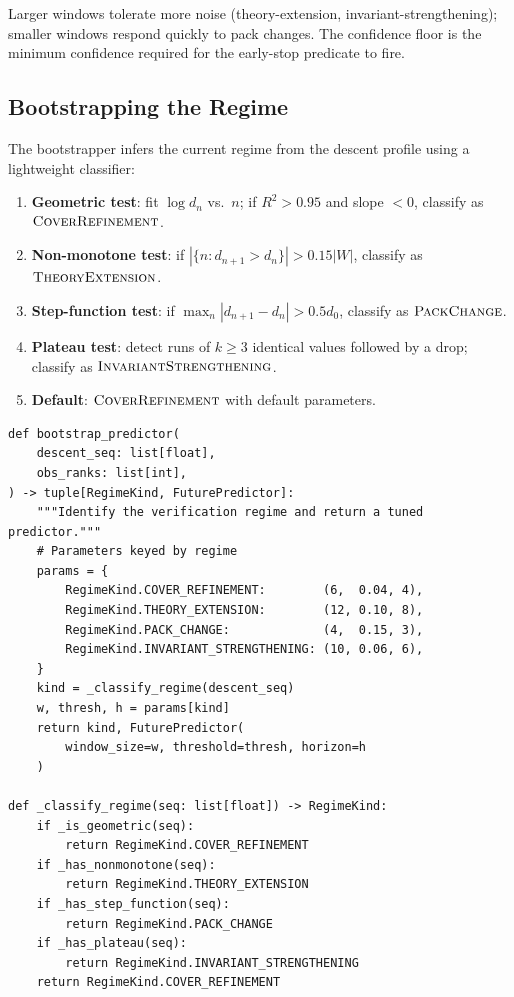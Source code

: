 \documentclass[11pt]{article}
\newcommand{\RKcov}{\textsc{CoverRefinement}}
\newcommand{\RKtheo}{\textsc{TheoryExtension}}
\newcommand{\RKpack}{\textsc{PackChange}}
\newcommand{\RKinv}{\textsc{InvariantStrengthening}}
\begin{document}
\noindent
Larger windows tolerate more noise (theory-extension, invariant-strengthening);
smaller windows respond quickly to pack changes.  The confidence floor
is the minimum confidence required for the early-stop predicate to fire.

\subsection{Bootstrapping the Regime}

The bootstrapper infers the current regime from the descent profile
using a lightweight classifier:

\begin{enumerate}
  \item \textbf{Geometric test}: fit $\log d_n$ vs.\ $n$; if $R^2 > 0.95$
        and slope $< 0$, classify as $\RKcov$.
  \item \textbf{Non-monotone test}: if $|\{n : d_{n+1} > d_n\}| > 0.15 |W|$,
        classify as $\RKtheo$.
  \item \textbf{Step-function test}: if $\max_n |d_{n+1} - d_n| > 0.5 d_0$,
        classify as $\RKpack$.
  \item \textbf{Plateau test}: detect runs of $k \ge 3$ identical values
        followed by a drop; classify as $\RKinv$.
  \item \textbf{Default}: $\RKcov$ with default parameters.
\end{enumerate}

\begin{lstlisting}[style=jugeo-python, caption={Regime bootstrapping: classify and configure predictor.}]
def bootstrap_predictor(
    descent_seq: list[float],
    obs_ranks: list[int],
) -> tuple[RegimeKind, FuturePredictor]:
    """Identify the verification regime and return a tuned predictor."""
    # Parameters keyed by regime
    params = {
        RegimeKind.COVER_REFINEMENT:        (6,  0.04, 4),
        RegimeKind.THEORY_EXTENSION:        (12, 0.10, 8),
        RegimeKind.PACK_CHANGE:             (4,  0.15, 3),
        RegimeKind.INVARIANT_STRENGTHENING: (10, 0.06, 6),
    }
    kind = _classify_regime(descent_seq)
    w, thresh, h = params[kind]
    return kind, FuturePredictor(
        window_size=w, threshold=thresh, horizon=h
    )

def _classify_regime(seq: list[float]) -> RegimeKind:
    if _is_geometric(seq):
        return RegimeKind.COVER_REFINEMENT
    if _has_nonmonotone(seq):
        return RegimeKind.THEORY_EXTENSION
    if _has_step_function(seq):
        return RegimeKind.PACK_CHANGE
    if _has_plateau(seq):
        return RegimeKind.INVARIANT_STRENGTHENING
    return RegimeKind.COVER_REFINEMENT
\end{lstlisting}
\end{document}
